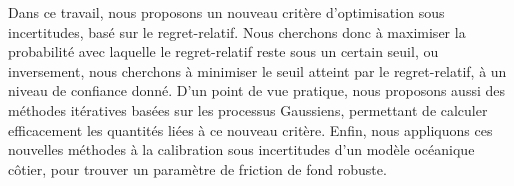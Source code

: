 Dans ce travail, nous proposons un nouveau critère d'optimisation sous incertitudes, basé sur le regret-relatif. Nous cherchons donc à maximiser la probabilité avec laquelle le regret-relatif reste sous un certain seuil, ou inversement, nous cherchons à minimiser le seuil atteint par le regret-relatif, à un niveau de confiance donné.  D'un point de vue pratique, nous proposons aussi des méthodes itératives basées sur les processus Gaussiens, permettant de calculer efficacement les quantités liées à ce nouveau critère.  Enfin, nous appliquons ces nouvelles méthodes à la calibration sous incertitudes d'un modèle océanique côtier, pour trouver un paramètre de friction de fond robuste.

